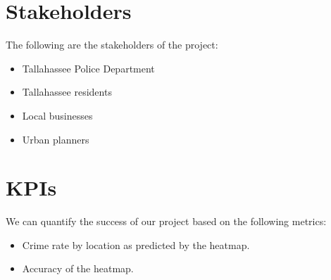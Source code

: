 \documentclass[10pt]{article}
\begin{document}
\section{Stakeholders}
The following are the stakeholders of the project:
\begin{itemize}
    \item Tallahassee Police Department
    \item Tallahassee residents
    \item Local businesses
    \item Urban planners
\end{itemize}


\section{KPIs}
We can quantify the success of our project based on the following metrics:
\begin{itemize}
    \item Crime rate by location as predicted by the heatmap.
    \item Accuracy of the heatmap.
\end{itemize}
\end{document}
